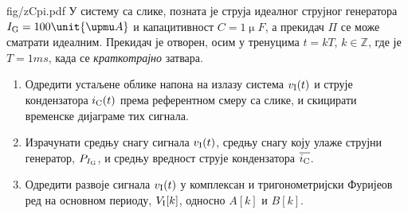 \mnDifficult
\begin{slikaDesno}[0.833]{fig/zCpi.pdf}
    \PID У систему са слике, позната је струја идеалног струјног 
генератора ${I_{\rm G} = 100\unit{\upmu A}}$ и
капацитивност $C = 1\unit{\upmu F}$, а прекидач $\Pi$ се 
може сматрати идеалним. Прекидач је отворен, осим у тренуцима 
$t = kT$, $k \in \mathbb Z$, где је $T = 1\unit{ms}$, 
када се 
\textit{краткотрајно} затвара.

\begin{enumerate}[label = (\alph*)]
    \item
    Одредити устаљене облике напона на излазу система 
    $v_{\rm I}(t)$ и струје кондензатора 
    $i_{\rm C}(t)$ према референтном смеру са слике, 
    и скицирати временске дијаграме тих сигнала.
\end{enumerate} 
\end{slikaDesno}

\begin{enumerate}[label = (\alph*)]   \setcounter{enumi}{1}
    \item Израчунати средњу снагу сигнала $v_{\rm I}(t)$,
    средњу снагу коју улаже струјни генератор, $P_{I_{\rm G}}$, и 
    средњу вредност струје кондензатора $\overline{i_{\rm C}}$. 
    
    \item
    Одредити развоје сигнала $v_{\rm I}(t)$ у комплексан и тригонометријски
    Фуријеов ред 
    на основном периоду, $V_{\rm I}[k]$, односно
    $A[k]$ и $B[k]$. 

\end{enumerate} 

\RESENJE

